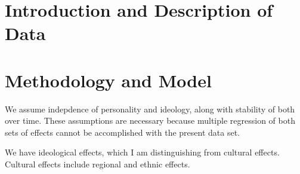 \documentclass[review]{elsarticle}
\begin{document}
\pagebreak
\linenumbers

\section{Introduction and Description of Data}





\section{Methodology and Model}

We assume indepdence of personality and ideology, along with stability of both over time.
These assumptions are necessary because multiple regression of both sets of effects cannot be accomplished with the present data set.

We have ideological effects, which I am distinguishing from cultural effects.
Cultural effects include regional and ethnic effects.
\end{document}
